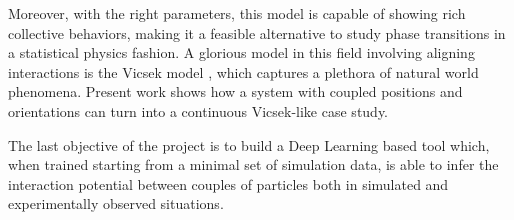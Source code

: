 \documentclass[../main.tex]{subfiles}
\begin{document}
	Moreover, with the right parameters, this model is capable of showing rich collective behaviors, making it a feasible alternative to study phase transitions in a statistical physics fashion. A glorious model in this field involving aligning interactions is the Vicsek model \parencite{vicsek_novel_1995}, which captures a plethora of natural world phenomena. Present work shows how a system with coupled positions and orientations can turn into a continuous Vicsek-like case study.
	
	The last objective of the project is to build a Deep Learning based tool which, when trained starting from a minimal set of simulation data, is able to infer the interaction potential between couples of particles both in simulated and experimentally observed situations.


	\begin{comment}
			\section{Passive Brownian Motion}
		Before adding the self-propulsion velocity, it is worthwhile to outline some facts about Passive Brownian motion in a 2-dimensional environment.
		Due to the collisions with the fluid molecules, a passive Brownian particle experiences random forces and torques so that its motion is purely diffusive, both in position and orientation with the following diffusion coefficients
		\begin{equation}
			D_t = \frac{k_B T}{\gamma_t} \quad D_r = \frac{k_B T}{\gamma_r} 
		\end{equation}
		
		being $\gamma_t = 6 \pi \eta a$ and $\gamma_r = 8 \pi \eta a^3$  the respective drag coefficients, where $a$ is the particle radius and $\eta$ is the fluid viscosity. The basis to build the model upon is the Langevin equation
		
		\begin{equation} \label{eq:lang1}
			m \mathbf{\ddot{r}} = -\gamma_t \mathbf{\dot{r}} + \mathbf{F}_{th}
		\end{equation} 
		
		where $\mathbf{F}_{th}$ is the random force given by the collisions with the fluid molecules.
		

\end{comment}
\end{document}
